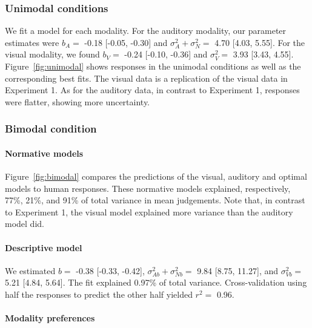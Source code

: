 \documentclass[english,floatsintext,man]{apa6}
\theoremstyle{definition}
\theoremstyle{definition}
\theoremstyle{definition}
\theoremstyle{remark}
\begin{document}
\subsubsection{Unimodal conditions}\label{unimodal-conditions-2}

We fit a model for each modality. For the auditory modality, our
parameter estimates were \(b_A=\) -0.18 {[}-0.05, -0.30{]} and
\(\sigma^2_A+\sigma^2_N=\) 4.70 {[}4.03, 5.55{]}. For the visual
modality, we found \(b_V=\) -0.24 {[}-0.10, -0.36{]} and \(\sigma^2_V=\)
3.93 {[}3.43, 4.55{]}. Figure~\ref{fig:unimodal} shows responses in the
unimodal conditions as well as the corresponding best fits. The visual
data is a replication of the visual data in Experiment 1. As for the
auditory data, in contrast to Experiment 1, responses were flatter,
showing more uncertainty.

\subsubsection{Bimodal condition}\label{bimodal-condition-2}

\paragraph{Normative models}\label{normative-models-1}

Figure~\ref{fig:bimodal} compares the predictions of the visual,
auditory and optimal models to human responses. These normative models
explained, respectively, 77\%, 21\%, and 91\% of total variance in mean
judgements. Note that, in contrast to Experiment 1, the visual model
explained more variance than the auditory model did.

\paragraph{Descriptive model}\label{descriptive-model-1}

We estimated \(b=\) -0.38 {[}-0.33, -0.42{]},
\(\sigma^2_{Ab}+\sigma^2_{Nb}=\) 9.84 {[}8.75, 11.27{]}, and
\(\sigma^2_{Vb}=\) 5.21 {[}4.84, 5.64{]}. The fit explained 0.97\% of
total variance. Cross-validation using half the responses to predict the
other half yielded \(r^2 =\) 0.96.

\paragraph{Modality preferences}\label{modality-preferences}
\end{document}
